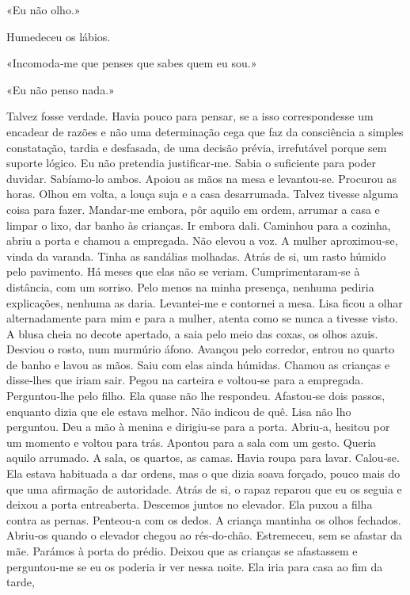 «Eu não olho.»

Humedeceu os lábios.

«Incomoda­‑me que penses que sabes quem eu sou.»

«Eu não penso nada.»

Talvez fosse verdade. Havia pouco para pensar, se a isso correspondesse
um encadear de razões e não uma determinação cega que faz da consciência
a simples constatação, tardia e desfasada, de uma decisão prévia,
irrefutável porque sem suporte lógico. Eu não pretendia justificar­‑me.
Sabia o suficiente para poder duvidar. Sabíamo­‑lo ambos. Apoiou as mãos
na mesa e levantou­‑se. Procurou as horas. Olhou em volta, a louça suja
e a casa desarrumada. Talvez tivesse alguma coisa para fazer. Mandar­‑me
embora, pôr aquilo em ordem, arrumar a casa e limpar o lixo, dar banho
às crianças. Ir embora dali. Caminhou para a cozinha, abriu a porta e
chamou a empregada. Não elevou a voz. A mulher aproximou­‑se, vinda da
varanda. Tinha as sandálias molhadas. Atrás de si, um rasto húmido pelo
pavimento. Há meses que elas não se veriam. Cumprimentaram­‑se à
distância, com um sorriso. Pelo menos na minha presença, nenhuma pediria
explicações, nenhuma as daria. Levantei­‑me e contornei a mesa. Lisa
ficou a olhar alternadamente para mim e para a mulher, atenta como se
nunca a tivesse visto. A blusa cheia no decote apertado, a saia pelo
meio das coxas, os olhos azuis. Desviou o rosto, num murmúrio áfono.
Avançou pelo corredor, entrou no quarto de banho e lavou as mãos. Saiu
com elas ainda húmidas. Chamou as crianças e disse­‑lhes que iriam sair.
Pegou na carteira e voltou­‑se para a empregada. Perguntou­‑lhe pelo
filho. Ela quase não lhe respondeu. Afastou­‑se dois passos, enquanto
dizia que ele estava melhor. Não indicou de quê. Lisa não lho perguntou.
Deu a mão à menina e dirigiu­‑se para a porta. Abriu­‑a, hesitou por um
momento e voltou para trás. Apontou para a sala com um gesto. Queria
aquilo arrumado. A sala, os quartos, as camas. Havia roupa para lavar.
Calou­‑se. Ela estava habituada a dar ordens, mas o que dizia soava
forçado, pouco mais do que uma afirmação de autoridade. Atrás de si, o
rapaz reparou que eu os seguia e deixou a porta entreaberta. Descemos
juntos no elevador. Ela puxou a filha contra as pernas. Penteou­‑a com
os dedos. A criança mantinha os olhos fechados. Abriu­‑os quando o
elevador chegou ao rés­‑do­‑chão. Estremeceu, sem se afastar da mãe.
Parámos à porta do prédio. Deixou que as crianças se afastassem e
perguntou­‑me se eu os poderia ir ver nessa noite. Ela iria para casa ao
fim da tarde,

